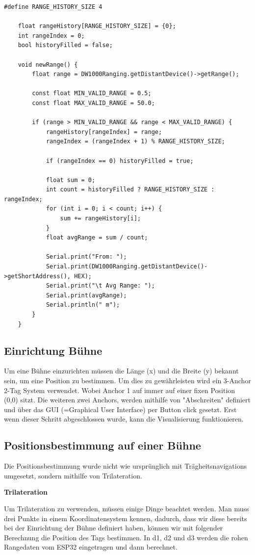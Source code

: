 \begin{lstlisting}[style=C++, caption=Kalibrierung der Anchor, captionpos=b]
	#define RANGE_HISTORY_SIZE 4
	
	float rangeHistory[RANGE_HISTORY_SIZE] = {0};
	int rangeIndex = 0;
	bool historyFilled = false;
	
	void newRange() {
		float range = DW1000Ranging.getDistantDevice()->getRange();
		
		const float MIN_VALID_RANGE = 0.5;
		const float MAX_VALID_RANGE = 50.0;
		
		if (range > MIN_VALID_RANGE && range < MAX_VALID_RANGE) {
			rangeHistory[rangeIndex] = range;
			rangeIndex = (rangeIndex + 1) % RANGE_HISTORY_SIZE;
			
			if (rangeIndex == 0) historyFilled = true;
			
			float sum = 0;
			int count = historyFilled ? RANGE_HISTORY_SIZE : rangeIndex;
			for (int i = 0; i < count; i++) {
				sum += rangeHistory[i];
			}
			float avgRange = sum / count;
			
			Serial.print("From: ");
			Serial.print(DW1000Ranging.getDistantDevice()->getShortAddress(), HEX);
			Serial.print("\t Avg Range: ");
			Serial.print(avgRange);
			Serial.println(" m");
		}
	}
\end{lstlisting}


\subsection{Einrichtung Bühne}
\label{Einrichtung Bühne}
Um eine Bühne einzurichten müssen die Länge (x) und die Breite (y) bekannt sein, um eine Position zu bestimmen. Um dies zu gewährleisten wird ein 3-Anchor 2-Tag System verwendet. Wobei Anchor 1 auf immer auf einer fixen Position (0,0) sitzt. Die weiteren zwei Anchors, werden mithilfe von "Abschreiten" definiert und über das GUI (=Graphical User Interface) per Button click gesetzt. Erst wenn dieser Schritt abgeschlossen wurde, kann die Visualisierung funktionieren.

\subsection{Positionsbestimmung auf einer Bühne}
Die Positionsbestimmung wurde nicht wie ursprünglich mit Trägheitsnavigations umgesetzt, sondern mithilfe von Trilateration. 

\textbf{Trilateration}

Um Trilateration zu verwenden, müssen einige Dinge beachtet werden. Man muss drei Punkte in einem Koordinatensystem kennen, dadurch, dass wir diese  bereits bei der Einrichtung der Bühne definiert haben, können wir mit folgender Berechnung die Position des Tags bestimmen. In d1, d2 und d3 werden die rohen Rangedaten vom ESP32 eingetragen und dann berechnet.

